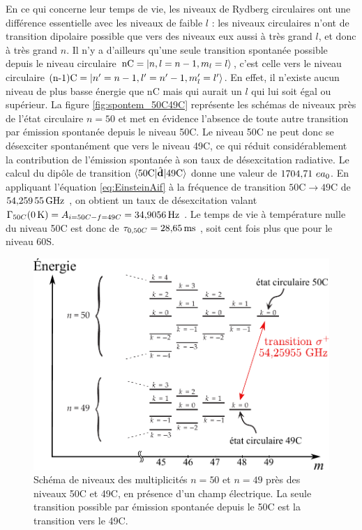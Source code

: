 En ce qui concerne leur temps de vie, les niveaux de Rydberg circulaires ont une différence essentielle avec les niveaux de faible $l$ : les niveaux circulaires n'ont de transition dipolaire possible que vers des niveaux eux aussi à très grand $l$, et donc à très grand $n$.
Il n'y a d'ailleurs qu'une seule transition spontanée possible depuis le niveau circulaire $\text{nC}=\ket{n,l=n-1,m_l=l}$, c'est celle vers le niveau circulaire $\text{(n-1)C}=\ket{n'=n-1,l'=n'-1,m_l'=l'}$.
En effet, il n'existe aucun niveau de plus basse énergie que $\mathrm{nC}$ mais qui aurait un $l$ qui lui soit égal ou supérieur.
La figure \eqref{fig:spontem_50C49C} représente les schémas de niveaux près de l'état circulaire $n=50$ et met en évidence l'absence de toute autre transition par émission spontanée depuis le niveau 50C.
Le niveau 50C ne peut donc se désexciter spontanément que vers le niveau 49C, ce qui réduit considérablement la contribution de l'émission spontanée à son taux de désexcitation radiative.
Le calcul du dipôle de transition $\braket{50\text{C}|\hat{\mathbf{d}}|49\text{C}}$ donne une valeur de $\numv{1704.71} e a_0$.
En appliquant l'équation \eqref{eq:EinsteinAif} à la fréquence de transition $\mathrm{50C}\rightarrow \mathrm{49C}$ de $\SIv{54.25955}{\giga\hertz}$, on obtient un taux de désexcitation valant $\Gamma_{50C}(\SIvv{0}{\kelvin}) = A_{i=50C-f=49C} = \SIv{34.9056}{\hertz}$.
Le temps de vie à température nulle du niveau 50C est donc de $\tau_{0,50C} = \SIv{28.65}{\ms}$, soit cent fois plus que pour le niveau 60S.
\begin{figure}[!h]
	\centering
	\includegraphics[width=.8\linewidth]{figures/theory/spontem_50C49C}
	\caption[Schéma de niveaux 50C-49C]{Schéma de niveaux des multiplicités $n=50$ et $n=49$ près des niveaux 50C et 49C, en présence d'un champ électrique. La seule transition possible par émission spontanée depuis le 50C est la transition vers le 49C.}
	\label{fig:spontem_50C49C}
\end{figure}

